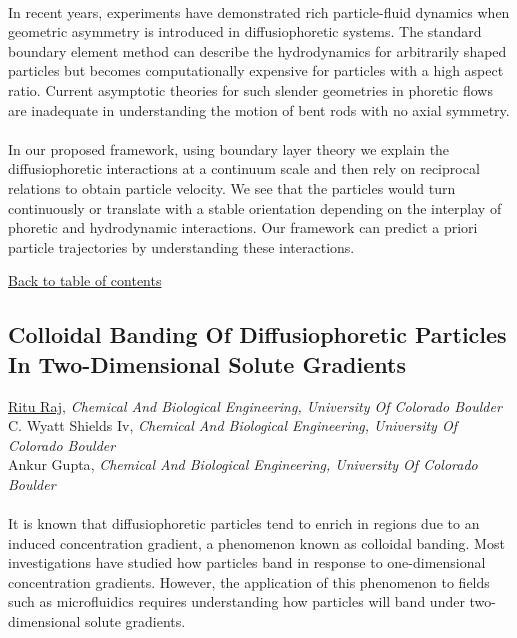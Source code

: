 \noindent  \\ 
\noindent In recent years, experiments have demonstrated rich particle-fluid dynamics when geometric asymmetry is introduced in diffusiophoretic systems. The standard boundary element method can describe the hydrodynamics for arbitrarily shaped particles but becomes computationally expensive for particles with a high aspect ratio. Current asymptotic theories for such slender geometries in phoretic flows are inadequate in understanding the motion of bent rods with no axial symmetry. \\ 
\noindent  \\ 
\noindent In our proposed framework, using boundary layer theory we explain the diffusiophoretic interactions at a continuum scale and then rely on reciprocal relations to obtain particle velocity. We see that the particles would turn continuously or translate with a stable orientation depending on the interplay of phoretic and hydrodynamic interactions. Our framework can predict a priori particle trajectories by understanding these interactions. \\ 
\begin{flushright}\vspace{-0.2 in}\hyperlink{toc}{Back to table of contents}\end{flushright}\vspace{-0.2 in}
\hypertarget{RituRaj}{\subsection*{\color{CUGOLD} Colloidal Banding Of Diffusiophoretic Particles In Two-Dimensional Solute Gradients}} \vsp 
\underline{Ritu Raj}, \textit{Chemical And Biological Engineering, University Of Colorado Boulder}\\ 
{C. Wyatt Shields Iv}, \textit{Chemical And Biological Engineering, University Of Colorado Boulder}\\ 
{Ankur Gupta}, \textit{Chemical And Biological Engineering, University Of Colorado Boulder}\\ 
\vspace{-0.1 in} \\ 
\noindent It is known that diffusiophoretic particles tend to enrich in regions due to an induced concentration gradient, a phenomenon known as colloidal banding. Most investigations have studied how particles band in response to one-dimensional concentration gradients. However, the application of this phenomenon to fields such as microfluidics requires understanding how particles will band under two-dimensional solute gradients. \\ 
